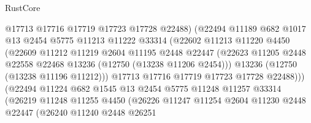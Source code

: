 \begin{lexlean}{RustCore}
\begin{coremodule}
                              @17713
                              @17716
                              @17719
                              @17723
                              @17728
                              @22488)
                            (@22494
                              @11189
                              @682
                              @1017
                              @13
                              @2454
                              @5775
                              @11213
                              @11222
                              @33314
                              (@22602
                                @11213
                                @11220
                                @4450
                                (@22609
                                  @11212
                                  @11219
                                  @2604
                                  @11195
                                  @2448
                                  @22447
                                  (@22623
                                    @11205
                                    @2448
                                    @22558
                                    @22468
                                    @13236
                                    (@12750 (@13238 @11206 @2454)))
                                  @13236
                                  (@12750 (@13238 @11196 @11212)))
                                @17713
                                @17716
                                @17719
                                @17723
                                @17728
                                @22488)))
                          (@22494
                            @11224
                            @682
                            @1545
                            @13
                            @2454
                            @5775
                            @11248
                            @11257
                            @33314
                            (@26219
                              @11248
                              @11255
                              @4450
                              (@26226
                                @11247
                                @11254
                                @2604
                                @11230
                                @2448
                                @22447
                                (@26240
                                  @11240
                                  @2448
                                  @26251

\end{coremodule}
\end{lexlean}
